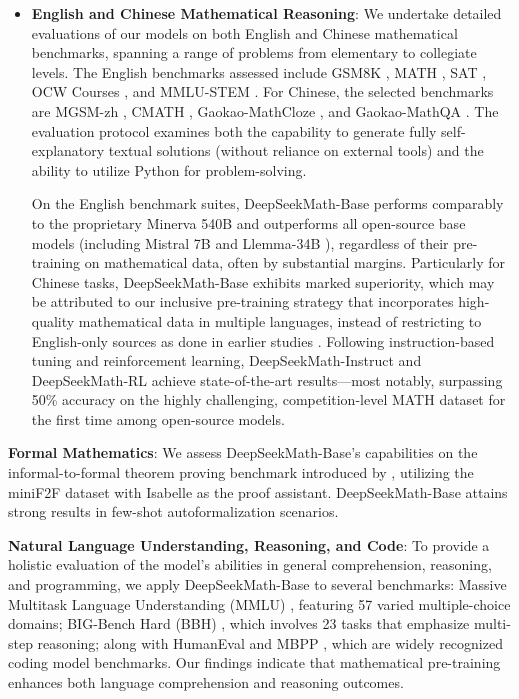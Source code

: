 \begin{itemize}[topsep=0pt]
    \item \textbf{English and Chinese Mathematical Reasoning}: We undertake detailed evaluations of our models on both English and Chinese mathematical benchmarks, spanning a range of problems from elementary to collegiate levels. The English benchmarks assessed include GSM8K \citep{gsm8k}, MATH \citep{MATH}, SAT \citep{llemma}, OCW Courses \citep{minerva}, and MMLU-STEM \citep{mmlu}. For Chinese, the selected benchmarks are MGSM-zh \citep{mgsm}, CMATH \citep{wei2023cmath}, Gaokao-MathCloze \citep{agieval}, and Gaokao-MathQA \citep{agieval}. The evaluation protocol examines both the capability to generate fully self-explanatory textual solutions (without reliance on external tools) and the ability to utilize Python for problem-solving.

    On the English benchmark suites, DeepSeekMath-Base performs comparably to the proprietary Minerva 540B \citep{minerva} and outperforms all open-source base models (including Mistral 7B \citep{mistral} and Llemma-34B \citep{llemma}), regardless of their pre-training on mathematical data, often by substantial margins. Particularly for Chinese tasks, DeepSeekMath-Base exhibits marked superiority, which may be attributed to our inclusive pre-training strategy that incorporates high-quality mathematical data in multiple languages, instead of restricting to English-only sources as done in earlier studies \citep{minerva,llemma}. Following instruction-based tuning and reinforcement learning, DeepSeekMath-Instruct and DeepSeekMath-RL achieve state-of-the-art results—most notably, surpassing 50\% accuracy on the highly challenging, competition-level MATH dataset for the first time among open-source models.
\end{itemize}

\item \textbf{Formal Mathematics}: We assess DeepSeekMath-Base's capabilities on the informal-to-formal theorem proving benchmark introduced by \citep{dsp_proof}, utilizing the miniF2F dataset \citep{minif2f} with Isabelle \citep{isabelle} as the proof assistant. DeepSeekMath-Base attains strong results in few-shot autoformalization scenarios.
\item \textbf{Natural Language Understanding, Reasoning, and Code}: To provide a holistic evaluation of the model’s abilities in general comprehension, reasoning, and programming, we apply DeepSeekMath-Base to several benchmarks: Massive Multitask Language Understanding (MMLU) \citep{mmlu}, featuring 57 varied multiple-choice domains; BIG-Bench Hard (BBH) \citep{bbh}, which involves 23 tasks that emphasize multi-step reasoning; along with HumanEval \citep{codex} and MBPP \citep{mbpp}, which are widely recognized coding model benchmarks. Our findings indicate that mathematical pre-training enhances both language comprehension and reasoning outcomes.

